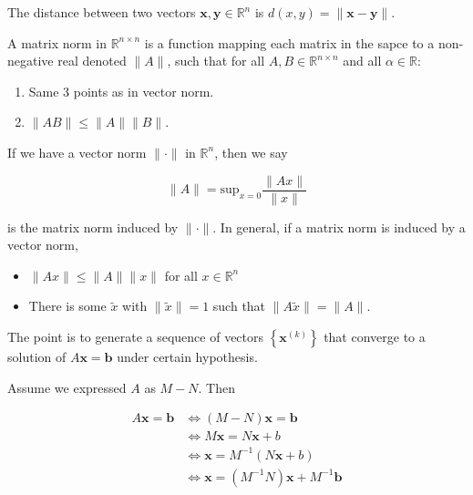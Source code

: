 \documentclass[12pt]{article}
\theoremstyle{definition}
\begin{document}
\begin{definition}[Distance]
    The distance between two vectors $\textbf{x}, \textbf{y} \in \mathbb{R}^n$
    is $d(x, y) = \|\textbf{x} - \textbf{y}\|$.
\end{definition}

\begin{definition}
    A matrix norm in $\mathbb{R}^{n\times n}$ is a function mapping each matrix
    in the sapce to a non-negative real denoted $\|A\|$, such that for all $A, B
    \in \mathbb{R}^{n\times n}$ and all $\alpha \in \mathbb{R}$:

    \begin{enumerate}
        \item Same 3 points as in vector norm. 
        \item $\|AB\| \leq \|A\|\|B\|$.
    \end{enumerate}
\end{definition}

If we have a vector norm $\|\cdot\|$ in $\mathbb{R}^n$, then we say 

\begin{equation*}
    \|A\| = \text{sup}_{x=0} \frac{\|A x\|}{\|x\|}
\end{equation*}

is the matrix norm induced by $\|\cdot\|$.  In general, if a matrix norm is
induced by a vector norm, 

\begin{itemize}
    \item $\|A x\|\leq \|A\| \|x\|$ for all $x \in \mathbb{R}^n$
    \item There is some $\widetilde{ x } $ with $\|\widetilde{ x } \| = 1$ such
        that $\|A \widetilde{ x } \| = \|A\|$.
\end{itemize}

The point is to generate a sequence of vectors $\left\{ \textbf{x}^{(k)}
\right\} $ that converge to a solution of $A\textbf{x} = \textbf{b}$ under
certain hypothesis.

Assume we expressed $A$ as $M - N$. Then 

\begin{align*}
    A\textbf{x} = \textbf{b} 
    &\iff (M - N)\textbf{x} = \textbf{b} \\ 
    &\iff M\textbf{x} = N\textbf{x} + b \\ 
    &\iff \textbf{x} = M^{-1}(N\textbf{x} + b) \\ 
    &\iff\textbf{x} = \left( M^{-1}N \right)\textbf{x} + M^{-1}\textbf{b}
\end{align*}
\end{document}
